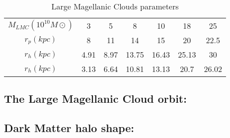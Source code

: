 \begin{table}[H]{\label{tab:LMC}}
\begin{center}
\begin{tabular}{c c c c c c c}
\hline
\hline
$M_{LMC} (10^10M\odot)$ & 3 & 5 & 8 & 10 & 18 & 25 \\
$r_p(kpc)$ & 8 & 11 & 14 & 15 & 20 & 22.5 \\
$r_h(kpc)$ & 4.91 & 8.97 & 13.75 & 16.43 & 25.13 & 30 \\
$r_h(kpc)$ & 3.13 & 6.64 & 10.81 & 13.13 & 20.7 & 26.02 \\
\hline
\end{tabular}
\end{center}
\caption{Large Magellanic Clouds parameters \label{tab:LMC}}
\end{table}

\subsection{The Large Magellanic Cloud orbit:}

\subsection{Dark Matter halo shape:}




 







